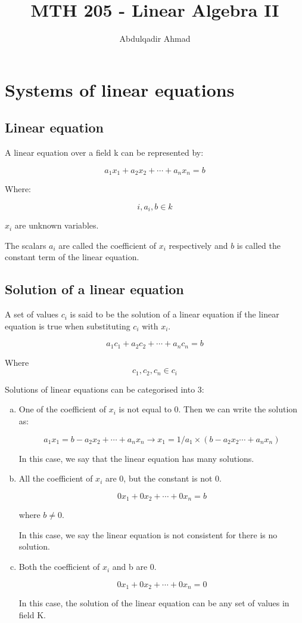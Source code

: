\documentclass{book}
\title{MTH 205 {-} Linear Algebra II}
\author{Abdulqadir Ahmad}
\begin{document}
\maketitle
\tableofcontents

\chapter{Systems of linear equations}

\section{Linear equation}

A linear equation over a field k can be represented by:

\[a_1 x_1 + a_2 x_2 + \cdots + a_n x_n = b\]

Where:

\[i, a_i, b \in k\]

\(x_i\) are unknown variables.

The scalars \(a_i\) are called the coefficient of \(x_i\) respectively and \(b\) is called the constant term of the linear equation.

\section{Solution of a linear equation}

A set of values \(c_i\) is said to be the solution of a linear equation if the linear equation is true when substituting \(c_i\) with \(x_i\).

\[a_1 c_1 + a_2 c_2 + \cdots + a_n c_n = b\]

Where \[c_1, c_2, c_n \in c_i\]

Solutions of linear equations can be categorised into 3:

\begin{enumerate}[a.]
	\item One of the coefficient of \(x_i\) is not equal to 0. Then we can write the solution as:

		\[a_1 x_1 = b - a_2 x_2 + \cdots + a_n x_n \rightarrow x_1 = 1/a_1 \times (b - a_2 x_2 \cdots + a_n x_n)\]

		In this case, we say that the linear equation has many solutions.

	\item All the coefficient of \(x_i\) are 0, but the constant is not 0.

		\[0 x_1 + 0 x_2 + \cdots + 0 x_n = b\]

		where \(b \ne 0\).

		In this case, we say the linear equation is not consistent for there is no solution.

	\item Both the coefficient of \(x_i\) and b are 0.

		\[0 x_1 + 0 x_2 + \cdots + 0 x_n = 0\]

		In this case, the solution of the linear equation can be any set of values in field K.
\end{enumerate}
\end{document}
